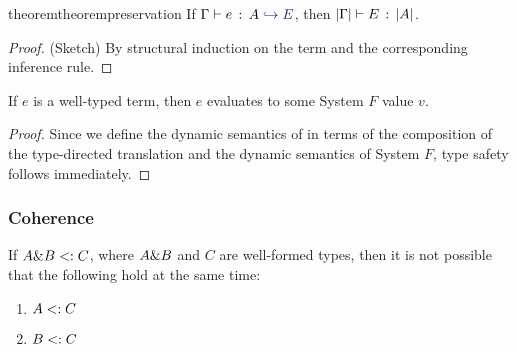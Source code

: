 \begin{restatable}{theorem}{theorempreservation}
  \label{theorem:preservation}
  If $ \hastype \Gamma e A \yields E $,
  then $ \lvert \Gamma \rvert \vdash E \ \!:\! \ \lvert A \rvert $.
\end{restatable}
\begin{proof}
(Sketch) By structural induction on the term and the corresponding
inference rule.
\end{proof}

\begin{theorem}
  If $e$ is a well-typed \name term, then $e$ evaluates to some System $F$
  value $v$.
\end{theorem}
\begin{proof}
  Since we define the dynamic semantics of \name in terms of the composition of
  the type-directed translation and the dynamic semantics of System $F$, type safety follows immediately.
\end{proof}

\subsubsection{Coherence}


%


\begin{lemma}
  \label{unique-subtype-contributor}
  If $A \& B <: C$, where $A \& B$ and $C$ are well-formed types,
  then it is not possible that the following hold at the same time:
\begin{enumerate}
\item $A <: C$
\item $B <: C$
\end{enumerate}
\end{lemma}

